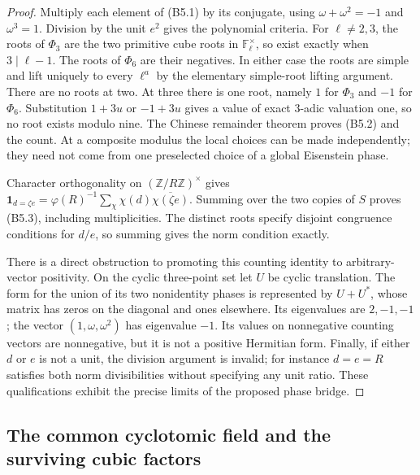 \begin{proof}
Multiply each element of (B5.1) by its conjugate, using
$\omega+\omega^2=-1$ and $\omega^3=1$. Division by the
unit $e^2$ gives the polynomial criteria. For
$\ell\ne2,3$, the roots of $\Phi_3$ are the two primitive
cube roots in $\mathbb F_\ell^\times$, so exist exactly
when $3\mid\ell-1$. The roots of $\Phi_6$ are their
negatives. In either case the roots are simple and lift
uniquely to every $\ell^a$ by the elementary simple-root
lifting argument. There are no roots at two. At three
there is one root, namely $1$ for $\Phi_3$ and $-1$ for
$\Phi_6$. Substitution $1+3u$ or $-1+3u$ gives a value
of exact 3-adic valuation one, so no root exists modulo
nine. The Chinese remainder theorem proves (B5.2) and
the count. At a composite modulus the local choices can
be made independently; they need not come from one
preselected choice of a global Eisenstein phase.

Character orthogonality on $(\mathbb Z/R\mathbb Z)^\times$
gives
$\mathbf1_{d=\zeta e}=\varphi(R)^{-1}
\sum_\chi\chi(d)\overline{\chi(\zeta e)}$.
Summing over the two copies of $S$ proves (B5.3), including
multiplicities. The distinct roots specify disjoint
congruence conditions for $d/e$, so summing gives the
norm condition exactly.

There is a direct obstruction to promoting this counting
identity to arbitrary-vector positivity. On the cyclic
three-point set let $U$ be cyclic translation. The form
for the union of its two nonidentity phases is represented
by $U+U^*$, whose matrix has zeros on the diagonal and
ones elsewhere. Its eigenvalues are $2,-1,-1$; the vector
$(1,\omega,\omega^2)$ has eigenvalue $-1$. Its values on
nonnegative counting vectors are nonnegative, but it is
not a positive Hermitian form. Finally, if either $d$ or
$e$ is not a unit, the division argument is invalid;
for instance $d=e=R$ satisfies both norm divisibilities
without specifying any unit ratio. These qualifications
exhibit the precise limits of the proposed phase bridge.
\end{proof}

\subsection{The common cyclotomic field and the surviving cubic factors}

